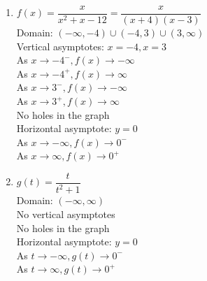 \begin{multicols}{2}
\begin{enumerate}
\setcounter{enumi}{\value{HW}}

\item $f(x) = \dfrac{x}{x^{2} + x - 12} = \dfrac{x}{(x + 4)(x - 3)}$\\
Domain: $(-\infty, -4) \cup (-4, 3) \cup (3, \infty)$\\
Vertical asymptotes: $x = -4, x = 3$\\
As $x \rightarrow -4^{-}, f(x) \rightarrow -\infty$\\
As $x \rightarrow -4^{+}, f(x) \rightarrow \infty$\\
As $x \rightarrow 3^{-}, f(x) \rightarrow -\infty$\\
As $x \rightarrow 3^{+}, f(x) \rightarrow \infty$\\
No holes in the graph\\
Horizontal asymptote: $y = 0$ \\
As $x \rightarrow -\infty, f(x) \rightarrow 0^{-}$\\
As $x \rightarrow \infty, f(x) \rightarrow 0^{+}$\\

\vfill

\columnbreak


\item $g(t) = \dfrac{t}{t^{2} + 1}$\\
Domain: $(-\infty, \infty)$\\
No vertical asymptotes\\
No holes in the graph\\
Horizontal asymptote: $y = 0$ \\
As $t \rightarrow -\infty, g(t) \rightarrow 0^{-}$\\
As $t \rightarrow \infty, g(t) \rightarrow 0^{+}$\\

\setcounter{HW}{\value{enumi}}
\end{enumerate}
\end{multicols}

